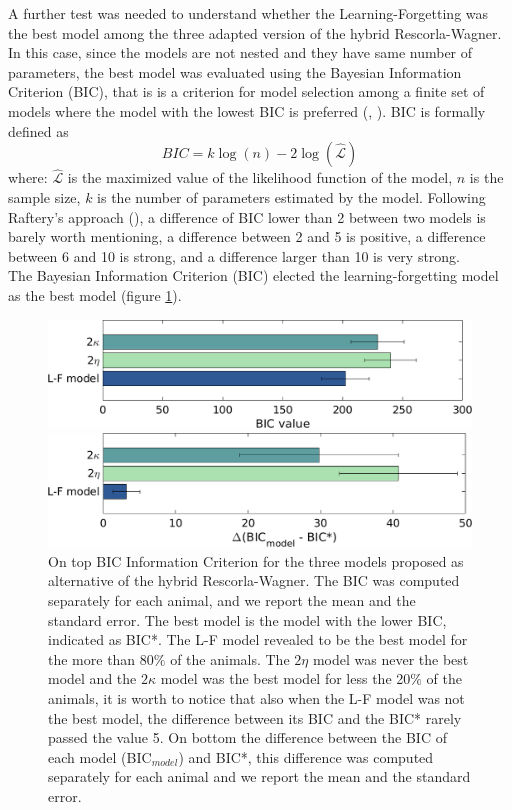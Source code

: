 A further test was needed to understand whether the Learning-Forgetting was the best model among the three adapted version of the hybrid Rescorla-Wagner. In this case, since the models are not nested and they have same number of parameters, the best model was evaluated using the Bayesian Information Criterion (BIC), that is is a criterion for model selection among a finite set of models where the model with the lowest BIC is preferred (\cite{Schwarz}, \cite{NeathCavanaugh}). BIC is formally defined as 
\begin{equation*}
    BIC=k\log(n)-2\log(\hat{\mathcal{L}})
\end{equation*}
where:
${\hat{\mathcal{L}}}$ is the maximized value of the likelihood function of the model, $n$ is the sample size, $k$ is the number of parameters estimated by the model.
Following Raftery’s approach (\cite{Raftery}), a difference of BIC lower than 2 between two models is barely worth mentioning, a difference between 2 and 5 is positive, a difference between 6 and 10 is strong, and a difference larger than 10 is very strong.\\
The Bayesian Information Criterion (BIC) elected the learning-forgetting model as the best model (figure \ref{fig:BIC}).\\
\begin{figure}
    \centering
    \includegraphics[scale=0.47]{figures/BIC_Value.png}
    
    \vspace{1cm}
    
    \includegraphics[scale=0.47]{figures/DeltaBIC.png}
    \caption{On top BIC Information Criterion for the three models proposed as alternative of the hybrid Rescorla-Wagner. The BIC was computed separately for each animal, and we report the mean and the standard error. The best model is the model with the lower BIC, indicated as BIC*. The L-F model revealed to be the best model for the more than 80$\%$ of the animals. The $2\eta$ model was never the best model and the $2\kappa$ model was the best model for less the 20$\%$ of the animals, it is worth to notice that also when the L-F model was not the best model, the difference between its BIC and the BIC* rarely passed the value 5. On bottom the difference between the BIC of each model (BIC$_{model}$) and BIC*, this difference was computed separately for each animal and we report the mean and the standard error.}
    \label{fig:BIC}
\end{figure}
